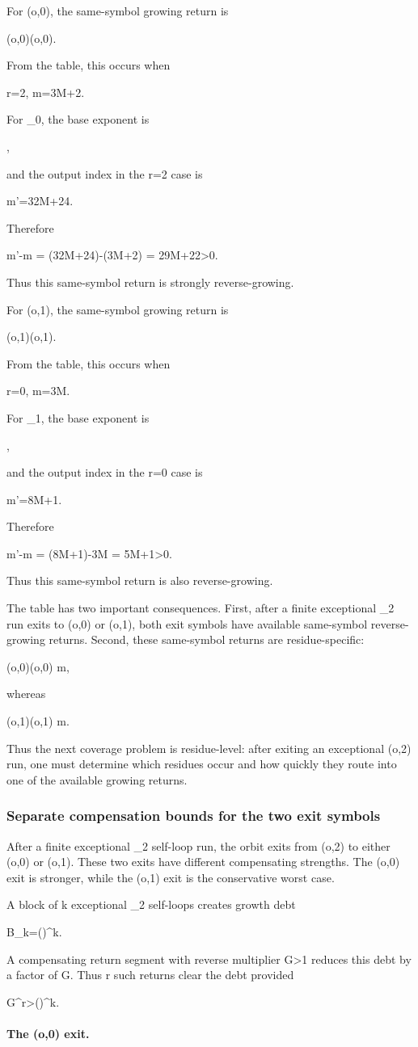 \documentclass[11pt,letterpaper]{amsart}
\def\({}%
\def\){}%
\def\[{ }%
\def\]{ }%
\theoremstyle{definition}
\theoremstyle{plain}
\theoremstyle{plain}
\theoremstyle{remark}
\begin{document}
For \((o,0)\), the same-symbol growing return is
\[
(o,0)(o,0).
\]
From the table, this occurs when
\[
r=2,
\qquad
m=3M+2.
\]
For \(\Omega_0\), the base exponent is
\[
,
\]
and the output index in the \(r=2\) case is
\[
m'=32M+24.
\]
Therefore
\[
m'-m
=
(32M+24)-(3M+2)
=
29M+22>0.
\]
Thus this same-symbol return is strongly reverse-growing.

For \((o,1)\), the same-symbol growing return is
\[
(o,1)(o,1).
\]
From the table, this occurs when
\[
r=0,
\qquad
m=3M.
\]
For \(\Omega_1\), the base exponent is
\[
,
\]
and the output index in the \(r=0\) case is
\[
m'=8M+1.
\]
Therefore
\[
m'-m
=
(8M+1)-3M
=
5M+1>0.
\]
Thus this same-symbol return is also reverse-growing.

The table has two important consequences.  First, after a finite
exceptional \(\Omega_2\) run exits to \((o,0)\) or \((o,1)\), both exit
symbols have available same-symbol reverse-growing returns.  Second,
these same-symbol returns are residue-specific:
\[
(o,0)(o,0)
\quad{}\quad
m,
\]
whereas
\[
(o,1)(o,1)
\quad{}\quad
m.
\]
Thus the next coverage problem is residue-level: after exiting an
exceptional \((o,2)\) run, one must determine which residues occur and
how quickly they route into one of the available growing returns.


\subsubsection{Separate compensation bounds for the two exit symbols}
\label{subsubsec:separate-exit-compensation-bounds}

After a finite exceptional \(\Omega_2\) self-loop run, the orbit exits
from \((o,2)\) to either \((o,0)\) or \((o,1)\).  These two exits have
different compensating strengths.  The \((o,0)\) exit is stronger, while
the \((o,1)\) exit is the conservative worst case.

A block of \(k\) exceptional \(\Omega_2\) self-loops creates growth debt
\[
B_k=\left(\right)^k.
\]
A compensating return segment with reverse multiplier \(G>1\) reduces
this debt by a factor of \(G\).  Thus \(r\) such returns clear the debt
provided
\[
G^r>\left(\right)^k.
\]

\paragraph{The \((o,0)\) exit.}
\end{document}
